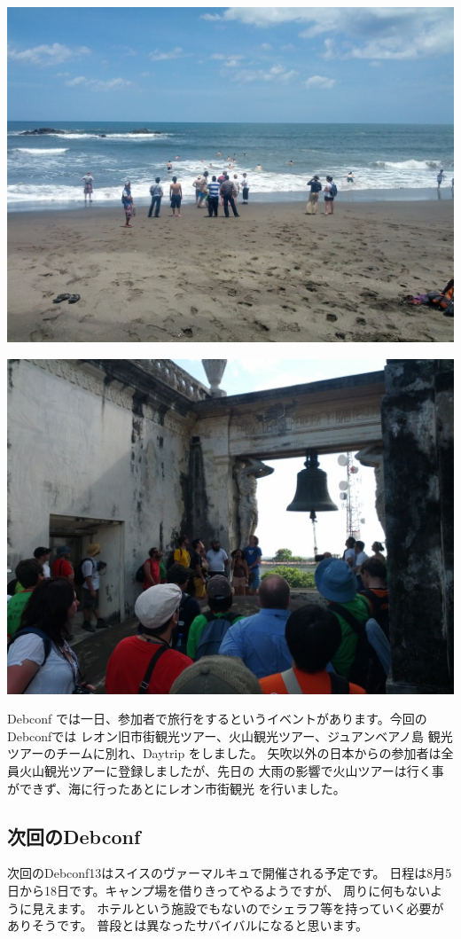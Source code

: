 \documentclass[mingoth,a4paper]{jsarticle}
\begin{document}
\begin{minipage}{0.4\hsize}
\includegraphics[width=0.8\hsize]{image201208/debconf12_daytrip01.jpg}
\end{minipage}
\begin{minipage}{0.4\hsize}
\includegraphics[width=0.8\hsize]{image201208/debconf12_daytrip03.jpg}
\end{minipage}

Debconf では一日、参加者で旅行をするというイベントがあります。今回の
Debconfでは レオン旧市街観光ツアー、火山観光ツアー、ジュアンベアノ島
観光ツアーのチームに別れ、Daytrip をしました。
矢吹以外の日本からの参加者は全員火山観光ツアーに登録しましたが、先日の
大雨の影響で火山ツアーは行く事ができず、海に行ったあとにレオン市街観光
を行いました。

\subsection{次回のDebconf}
次回のDebconf13はスイスのヴァーマルキュで開催される予定です。
日程は8月5日から18日です。キャンプ場を借りきってやるようですが、
周りに何もないように見えます。
ホテルという施設でもないのでシェラフ等を持っていく必要がありそうです。
普段とは異なったサバイバルになると思います。
\end{document}
